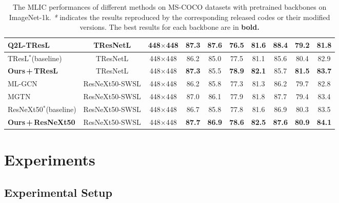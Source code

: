 \documentclass{article}
\begin{document}
\begin{table}[t]
{\begin{tabular}{lccccccccc}
        Q2L-TResL~\cite{liu2021query2label}      & TResNetL       & 448$\times$448  & \textbf{87.3}& \textbf{87.6}& 76.5         & 81.6         & \textbf{88.4}& 79.2         & 81.8  \\
        \midrule
        TResL\textbf{$^*$}(baseline)             & TResNetL       & 448$\times$448  & 86.2         & 85.0         & 77.5         & 81.1         & 85.6         & 80.4         & 82.9  \\
        \textbf{Ours\,+\,TResL}                  & TResNetL       & 448$\times$448  & \textbf{87.3}& 85.5         & \textbf{78.9}& \textbf{82.1}& 85.7         & \textbf{81.5}& \textbf{83.7}\\
        \bottomrule
        \toprule
        ML-GCN~\cite{nguyen2021modular}          & ResNeXt50-SWSL & 448$\times$448  & 86.2         & 85.8         & 77.3         & 81.3         & 86.2         & 79.7         & 82.8      \\
        MGTN~\cite{nguyen2021modular}            & ResNeXt50-SWSL & 448$\times$448  & 87.0         & 86.1         & 77.9         & 81.8         & 87.7         & 79.4         & 83.4      \\
        \midrule
        ResNeXt50\textbf{$^*$}(baseline)         & ResNeXt50-SWSL & 448$\times$448  & 86.7         & 85.8         & 77.8         & 81.6         & 86.9         & 80.3         & 83.5          \\
        \textbf{Ours\,+\,ResNeXt50}              & ResNeXt50-SWSL & 448$\times$448  & \textbf{87.7}& \textbf{86.9}& \textbf{78.6}& \textbf{82.5}& \textbf{87.6}& \textbf{80.9}& \textbf{84.1} \\
        \bottomrule
    \end{tabular}
    }
    \vspace{-0.2cm}
    \caption{The MLIC performances of different methods on MS-COCO datasets with pretrained backbones on ImageNet-1k.
   \emph{*} indicates the results reproduced by the corresponding released codes or their modified versions. The best results for each backbone are in \textbf{bold.}
    }
    \label{coco}
    \vspace{-0.5cm}
\end{table}

\vspace{-0.25cm}
\section{Experiments}
\vspace{-0.1cm}
\subsection{Experimental Setup}
\end{document}
